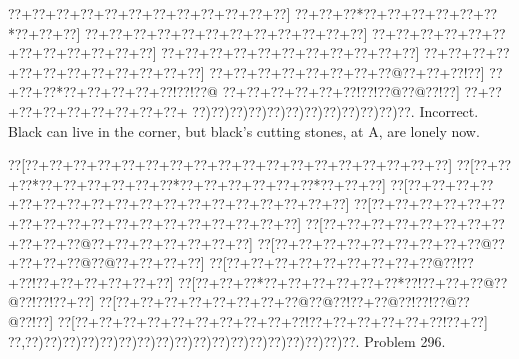 \documentclass[a5paper]{article}
\begin{document}
\begin{center}
{\goo
\0??+\0??+\0??+\0??+\0??+\0??+\0??+\0??+\0??+\0??+\0??+\0??]
\0??+\0??+\0??*\0??+\0??+\0??+\0??+\0??+\0??*\0??+\0??+\0??]
\0??+\0??+\0??+\0??+\0??+\0??+\0??+\0??+\0??+\0??+\0??+\0??]
\0??+\0??+\0??+\0??+\0??+\0??+\0??+\0??+\0??+\0??+\0??+\0??]
\0??+\0??+\0??+\0??+\0??+\0??+\0??+\0??+\0??+\0??+\0??]
\0??+\0??+\0??+\0??+\0??+\0??+\0??+\0??+\0??+\0??+\0??+\0??]
\0??+\0??+\0??+\0??+\0??+\0??+\0??+\0??@\0??+\0??+\0??!\0??]
\0??+\0??+\0??*\0??+\0??+\0??+\0??+\0??!\0??!\0??@
\0??+\0??+\0??+\0??+\0??+\0??!\0??!\0??@\0??@\0??!\0??]
\0??+\0??+\0??+\0??+\0??+\0??+\0??+\0??+\0??+
\0??)\0??)\0??)\0??)\0??)\0??)\0??)\0??)\0??)\0??)\0??)\0??.
}
Incorrect. Black can live in the corner, but black's cutting stones, at A, are lonely now.

\end{center}
\newpage
\begin{center}
{\goo
\0??[\0??+\0??+\0??+\0??+\0??+\0??+\0??+\0??+\0??+\0??+\0??+\0??+\0??+\0??+\0??+\0??+\0??+\0??]
\0??[\0??+\0??+\0??*\0??+\0??+\0??+\0??+\0??+\0??*\0??+\0??+\0??+\0??+\0??+\0??*\0??+\0??+\0??]
\0??[\0??+\0??+\0??+\0??+\0??+\0??+\0??+\0??+\0??+\0??+\0??+\0??+\0??+\0??+\0??+\0??+\0??+\0??]
\0??[\0??+\0??+\0??+\0??+\0??+\0??+\0??+\0??+\0??+\0??+\0??+\0??+\0??+\0??+\0??+\0??+\0??+\0??]
\0??[\0??+\0??+\0??+\0??+\0??+\0??+\0??+\0??+\0??+\0??+\0??@\0??+\0??+\0??+\0??+\0??+\0??+\0??]
\0??[\0??+\0??+\0??+\0??+\0??+\0??+\0??+\0??+\0??@\0??+\0??+\0??+\0??@\0??@\0??+\0??+\0??+\0??]
\0??[\0??+\0??+\0??+\0??+\0??+\0??+\0??+\0??+\0??@\0??!\0??+\0??!\0??+\0??+\0??+\0??+\0??+\0??]
\0??[\0??+\0??+\0??*\0??+\0??+\0??+\0??+\0??+\0??*\0??!\0??+\0??+\0??@\0??@\0??!\0??!\0??+\0??]
\0??[\0??+\0??+\0??+\0??+\0??+\0??+\0??+\0??@\0??@\0??!\0??+\0??@\0??!\0??!\0??@\0??@\0??!\0??]
\0??[\0??+\0??+\0??+\0??+\0??+\0??+\0??+\0??+\0??+\0??!\0??+\0??+\0??+\0??+\0??+\0??!\0??+\0??]
\0??,\0??)\0??)\0??)\0??)\0??)\0??)\0??)\0??)\0??)\0??)\0??)\0??)\0??)\0??)\0??)\0??)\0??)\0??.
}
Problem 296.

\end{center}
\end{document}
